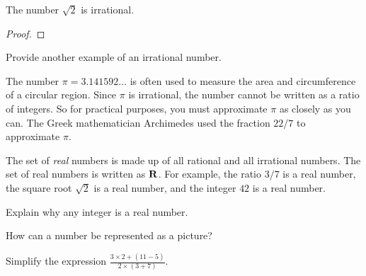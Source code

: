 \documentclass[a4paper,oneside,12pt]{article}
\begin{document}
\begin{theorem}
The number $\sqrt{2}$ is irrational.
\end{theorem}

\begin{proof}

\end{proof}

\begin{exercise}
Provide another example of an irrational number.
\end{exercise}


The number $\pi = 3.141592\dots$ is often used to measure the area and
circumference of a circular region.  Since $\pi$ is irrational, the
number cannot be written as a ratio of integers.  So for practical
purposes, you must approximate $\pi$ as closely as you can.  The Greek
mathematician Archimedes used the fraction $22 / 7$ to approximate
$\pi$.

The set of \emph{real} numbers is made up of all rational and all
irrational numbers.  The set of real numbers is written as $\mathbf{R}$.  For
example, the ratio $3/7$ is a real number, the square root $\sqrt{2}$
is a real number, and the integer $42$ is a real number.

\begin{exercise}
Explain why any integer is a real number.
\end{exercise}


\begin{exercise}
How can a number be represented as a picture?
\end{exercise}


\begin{exercise}
Simplify the expression
$\displaystyle{
  \frac{
    3 \times 2 + (11 - 5)
  }{
    2 \times (3 + 7)
  }
}$.
\end{exercise}
\end{document}
